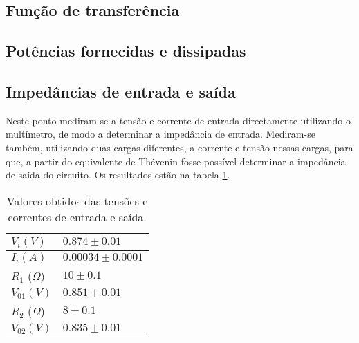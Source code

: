 \documentclass[%
  reprint,
  nofootinbib,
  amsmath,amssymb,
  aps,
  10pt,
  a4paper
]{revtex4-1}
\begin{document}
\subsection{Função de transferência}
\subsection{Potências fornecidas e dissipadas}
\subsection{Impedâncias de entrada e saída}
Neste ponto mediram-se a tensão e corrente de entrada directamente utilizando o multímetro, de modo a determinar a impedância de entrada. Mediram-se também, utilizando duas cargas diferentes, a corrente e tensão nessas cargas, para que, a partir do equivalente de Thévenin fosse possível determinar a impedância de saída do circuito. Os resultados estão na tabela \ref{tab:impedancia}.

\begin{table}[h]
    \begin{tabular}{|l|l|}
\hline
         $ V_i (V)$	&	$0.874  \pm 0.01$		                    \\ \hline
	$I_i (A)$	&	$0.00034 \pm 0.0001$			\\ \hline 
	$R_1$ ($\Omega$) &	$10\pm0.1$			 \\ \hline
	$V_{01}  (V)$	&   	$0.851\pm0.01$	                       \\ \hline
           $R_2$ ($\Omega$) &  $8\pm0.1$   \\ \hline
           $V_{02} (V)$ &   $0.835 \pm 0.01$ \\ \hline

    \end{tabular}
    \caption{Valores obtidos das tensões e correntes de entrada e saída.}
    \label{tab:impedancia}
\end{table}
\end{document}
